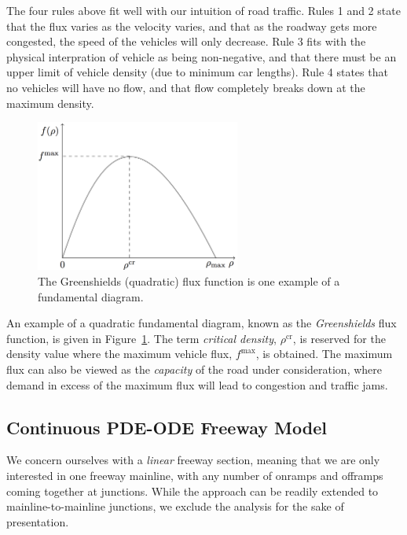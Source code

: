 The four rules above fit well with our intuition of road traffic. Rules 1 and 2 state that the flux varies as the velocity varies, and that as the roadway gets more congested, the speed of the vehicles will only decrease. Rule 3 fits with the physical interpration of vehicle as being non-negative, and that there must be an upper limit of vehicle density (due to minimum car lengths). Rule 4 states that no vehicles will have no flow, and that flow completely breaks down at the maximum density.

\begin{figure}[htbp]
	\centering
	\includegraphics[width=0.6\textwidth]{diagrams/fd}
	\caption{The Greenshields (quadratic) flux function is one example of a fundamental diagram.}
	\label{fig:greenshields-fd}
\end{figure}

An example of a quadratic fundamental diagram, known as the \emph{Greenshields} flux function, is given in Figure~\ref{fig:greenshields-fd}. The term \emph{critical density}, $\rho^{\text{cr}}$, is reserved for the density value where the maximum vehicle flux, $f^{\max}$, is obtained. The maximum flux can also be viewed as the \emph{capacity} of the road under consideration, where demand in excess of the maximum flux will lead to congestion and traffic jams.

\subsection{Continuous PDE-ODE Freeway Model}
\label{sec:continuous-pde-ode-freeway-model}

We concern ourselves with a \emph{linear} freeway section, meaning that we are only interested in one freeway mainline, with any number of onramps and offramps coming together at junctions. While the approach can be readily extended to mainline-to-mainline junctions, we exclude the analysis for the sake of presentation.

